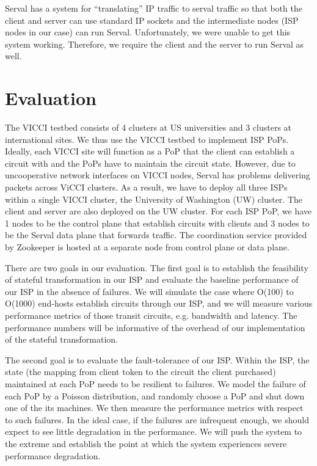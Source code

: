 \documentclass{article}
\begin{document}
Serval has a system for ``translating'' IP traffic to serval traffic
so that both the client and server can use standard IP sockets and the
intermediate nodes (ISP nodes in our case) can run
Serval. Unfortunately, we were unable to get this system
working. Therefore, we require the client and the server to run Serval
as well.

\section{Evaluation}

The VICCI testbed consists of 4 clusters at US universities and 3
clusters at international sites. We thus use the VICCI testbed to
implement ISP PoPs.
Ideally, each VICCI site will function
as a PoP that the client can establish a circuit with and the PoPs
have to maintain the circuit state.
However, due to uncooperative network interfaces on VICCI nodes,
Serval has problems delivering packets across ViCCI clusters.
As a result, we have to deploy all three ISPs within a single VICCI cluster,
 the University of Washington (UW) cluster. The client and server are also deployed
 on the UW cluster.
For each ISP PoP, we have
1 nodes to be the control plane that establish circuits with clients
and 3 nodes to be the Serval data plane that forwards
traffic. The coordination service provided by Zookeeper is hosted
at a separate node from control plane or data plane.

There are two goals in our evaluation. The first goal is to establish
the feasibility of stateful transformation in our ISP and evaluate the
baseline performance of our ISP in the absence of failures. We will
simulate the case where O(100) to O(1000) end-hosts establish circuits
through our ISP, and we will measure various performance metrics of
those transit circuits, e.g. bandwidth and latency. The performance
numbers will be informative of the overhead of our implementation of
the stateful transformation.

The second goal is to evaluate the fault-tolerance of our ISP. Within
the ISP, the state (the mapping from client token to the circuit the
client purchased) maintained at each PoP needs to be resilient to
failures. We model the failure of each PoP by a Poisson distribution,
and randomly choose a PoP and shut down one of the its machines. We
then measure the performance metrics with respect to such failures. In
the ideal case, if the failures are infrequent enough, we should
expect to see little degradation in the performance. We will push the
system to the extreme and establish the point at which the system
experiences severe performance degradation.



\end{document}

